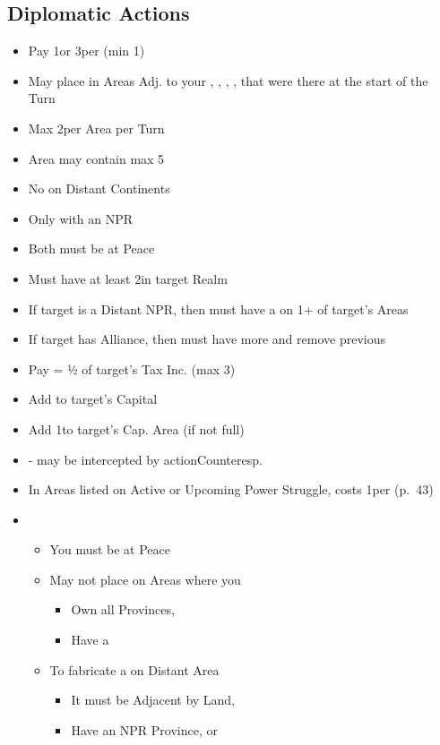 \documentclass[10pt]{article}
\begin{document}
\subsection*{Diplomatic Actions}
\begin{itemize}
	\item Pay 1\diplopower or 3\ducats per \influence (min 1\diplopower)
	\item May place \influence in Areas Adj. to your \towns, \vassals, \alliances, \marriages, \influence that were there at the start of the Turn
	\item Max 2\influence per Area per Turn
	\item Area may contain max 5\influence
	\item No \influence on Distant Continents
\end{itemize}

\begin{itemize}
	\item Only with an NPR
	\item Both must be at Peace
	\item Must have at least 2\influence in target Realm
	\item If target is a Distant NPR, then must have a \claim on 1+ of target's Areas
	\item If target has Alliance, then must have more \influence and remove previous \alliance
	\item Pay \diplopower = ½ of target's Tax Inc. (max 3)
	\item Add \alliance to target's Capital
	\item Add 1\influence to target's Cap. Area (if not full)
\end{itemize}

\begin{itemize}
	\item \covertaction - may be intercepted by action{Counteresp.}
	\item In Areas listed on Active or Upcoming Power Struggle, costs 1\diplopower per \claim (p.~43)
	\item {}
	\begin{itemize}
		\item You must be at Peace
		\item May not place \claim on Areas where you
		\begin{itemize}
			\item Own all Provinces,  
			\item Have a \claim
		\end{itemize}
		\item To fabricate a \claim on Distant Area
		\begin{itemize}
			\item It must be Adjacent by Land, 
			\item Have an NPR Province, \vassal or \town
		\end{itemize}
	\end{itemize}
\end{itemize}
\end{document}

